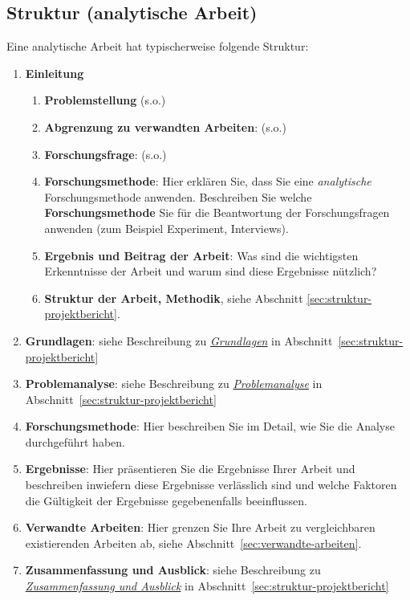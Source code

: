 \subsection{Struktur (analytische Arbeit)}

Eine analytische Arbeit hat typischerweise folgende Struktur:

\begin{enumerate}
    \item \textbf{Einleitung}
    \begin{enumerate}
        \item \textbf{Problemstellung} (s.o.)
        \item \textbf{Abgrenzung zu verwandten Arbeiten}: (s.o.)
        \item \textbf{Forschungsfrage}: (s.o.)
        \item \textbf{Forschungsmethode}: Hier erklären Sie, dass Sie eine \textit{analytische} Forschungsmethode anwenden. Beschreiben Sie welche \textbf{Forschungsmethode} Sie für die Beantwortung der Forschungsfragen anwenden (zum Beispiel Experiment, Interviews).
        \item \textbf{Ergebnis und Beitrag der Arbeit}: Was sind die wichtigsten Erkenntnisse der Arbeit und warum sind diese Ergebnisse nützlich?
        \item {\bf Struktur der Arbeit, Methodik}, siehe Abschnitt \ref{sec:struktur-projektbericht}.
    \end{enumerate}
    
    \item \textbf{Grundlagen}: siehe Beschreibung zu \hyperref[struktur:grundlagen]{\textit{Grundlagen}}  in Abschnitt~\ref{sec:struktur-projektbericht}
    \item \textbf{Problemanalyse}: siehe Beschreibung zu \hyperref[struktur:problemanalyse]{\textit{Problemanalyse}}  in Abschnitt~\ref{sec:struktur-projektbericht}
    \item \textbf{Forschungsmethode}: Hier beschreiben Sie im Detail, wie Sie die Analyse durchgeführt haben.
    \item \textbf{Ergebnisse}: Hier präsentieren Sie die Ergebnisse Ihrer Arbeit und beschreiben inwiefern diese Ergebnisse verlässlich sind und welche Faktoren die Gültigkeit der Ergebnisse gegebenenfalls beeinflussen.
    \item \textbf{Verwandte Arbeiten}: Hier grenzen Sie Ihre Arbeit zu vergleichbaren existierenden Arbeiten ab, siehe Abschnitt~\ref{sec:verwandte-arbeiten}.
    \item \textbf{Zusammenfassung und Ausblick}:
    siehe Beschreibung zu \hyperref[struktur:zusammenfassung-ausblick]{\textit{Zusammenfassung und Ausblick}}  in Abschnitt~\ref{sec:struktur-projektbericht}    
    
\end{enumerate}

